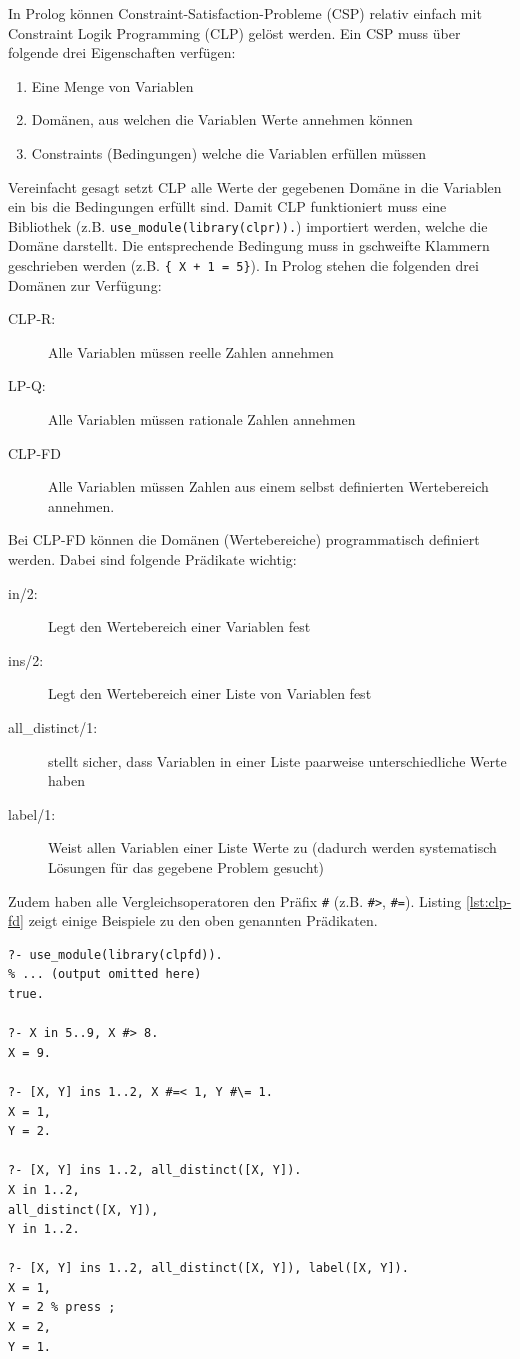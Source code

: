 In Prolog können Constraint-Satisfaction-Probleme (CSP) relativ einfach mit Constraint Logik Programming (CLP) gelöst werden. Ein CSP muss über folgende drei Eigenschaften verfügen:
\begin{enumerate}
	\item Eine Menge von Variablen
	\item Domänen, aus welchen die Variablen Werte annehmen können
	\item Constraints (Bedingungen) welche die Variablen erfüllen müssen
\end{enumerate}
Vereinfacht gesagt setzt CLP alle Werte der gegebenen Domäne in die Variablen ein bis die Bedingungen erfüllt sind. Damit CLP funktioniert muss eine Bibliothek (z.B. \verb|use_module(library(clpr)).|) importiert werden, welche die Domäne darstellt. Die entsprechende Bedingung muss in gschweifte Klammern geschrieben werden (z.B. \verb|{ X + 1 = 5}|). In Prolog stehen die folgenden drei Domänen zur Verfügung:
\begin{description}
	\item[CLP-R:] Alle Variablen müssen reelle Zahlen annehmen
	\item[LP-Q:] Alle Variablen müssen rationale Zahlen annehmen
	\item[CLP-FD] Alle Variablen müssen Zahlen aus einem selbst definierten Wertebereich annehmen.
\end{description}
Bei CLP-FD können die Domänen (Wertebereiche) programmatisch definiert werden. Dabei sind folgende Prädikate wichtig:
\begin{description}
	\item[in/2:] Legt den Wertebereich einer Variablen fest
	\item[ins/2:] Legt den Wertebereich einer Liste von Variablen fest
	\item[all\_distinct/1:] stellt sicher, dass Variablen in einer Liste paarweise unterschiedliche Werte haben
	\item[label/1:] Weist allen Variablen einer Liste Werte zu (dadurch werden systematisch Lösungen für das gegebene Problem gesucht)
\end{description}
Zudem haben alle Vergleichsoperatoren den Präfix \verb|#| (z.B. \verb|#>|, \verb|#=|). Listing \ref{lst:clp-fd} zeigt einige Beispiele zu den oben genannten Prädikaten.
\begin{lstlisting}[caption=CLP-FD, label=lst:clp-fd]
?- use_module(library(clpfd)).
% ... (output omitted here)
true.

?- X in 5..9, X #> 8.
X = 9.

?- [X, Y] ins 1..2, X #=< 1, Y #\= 1.
X = 1,
Y = 2.

?- [X, Y] ins 1..2, all_distinct([X, Y]).
X in 1..2,
all_distinct([X, Y]),
Y in 1..2.

?- [X, Y] ins 1..2, all_distinct([X, Y]), label([X, Y]).
X = 1,
Y = 2 % press ;
X = 2,
Y = 1.
\end{lstlisting}

